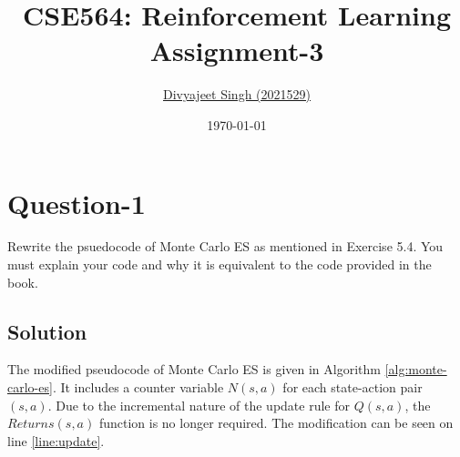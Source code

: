 \documentclass[11pt]{article}
\title{
    \textbf{CSE564: Reinforcement Learning} \\ \vspace*{-5pt}
    \textbf{\large{Assignment-3}}
}
\author{\href{mailto:divyajeet21529@iiitd.ac.in}{Divyajeet Singh (2021529)}}
\date{\today}
\begin{document}
    \maketitle

    \section*{Question-1}
    Rewrite the psuedocode of Monte Carlo ES as mentioned in Exercise 5.4. You must explain
    your code and why it is equivalent to the code provided in the book.

    \subsection*{Solution}
    The modified pseudocode of Monte Carlo ES is given in Algorithm \ref{alg:monte-carlo-es}.
    It includes a counter variable $N(s, a)$ for each state-action pair $(s, a)$. Due to the incremental
    nature of the update rule for $Q(s, a)$, the $Returns(s, a)$ function is no longer required.
    The modification can be seen on line \ref{line:update}.
\end{document}

